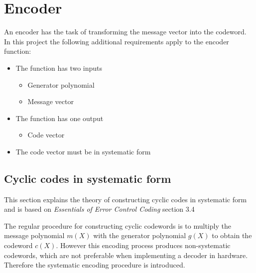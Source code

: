\documentclass[Main]{subfiles}
\begin{document}


\chapter{Encoder}
An encoder has the task of transforming the message vector into the codeword. In this project the following additional requirements apply to the encoder function:

\begin{itemize}
\item The function has two inputs
	\begin{itemize}
	\item Generator polynomial
	\item Message vector
	\end{itemize}
\item The function has one output
	\begin{itemize}
	\item Code vector
	\end{itemize}
\item The code vector must be in systematic form
\end{itemize} 

\section{Cyclic codes in systematic form}
\label{sec:cyclicCodeInSystematicForm}
This section explains the theory of constructing cyclic codes in systematic form and is based on \emph{Essentials of Error Control Coding}\cite{essentials} section 3.4

The regular procedure for constructing cyclic codewords is to multiply the message polynomial $m(X)$ with the generator polynomial $g(X)$ to obtain the codeword $c(X)$. However this encoding process produces non-systematic codewords, which are not preferable when implementing a decoder in hardware. Therefore the systematic encoding procedure is introduced.
\end{document}
